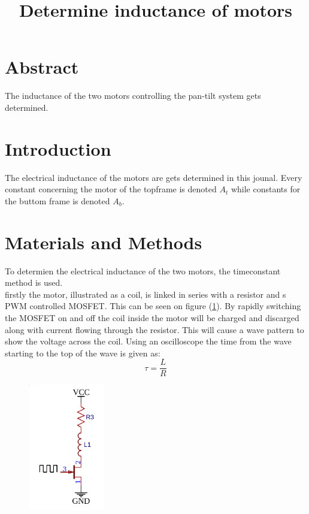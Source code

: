 \documentclass[../../rapport/main]{article}
\title{Determine inductance of motors}
\begin{document}
\section{Abstract}
The inductance of the two motors controlling the pan-tilt system gets determined.
\section{Introduction}
The electrical inductance of the motors are gets determined in this jounal. Every constant concerning the motor of the topframe is denoted $A_t$ while constants for the buttom frame is denoted $A_b$.
\section{Materials and Methods}

To determien the electrical inductance of the two motors, the timeconstant method is used.\\
firstly the motor, illustrated as a coil, is linked in series with a resistor and s PWM controlled MOSFET. This can be seen on figure (\ref{fig:inductance_circuit}). By rapidly switching the MOSFET on and off the coil inside the motor will be charged and discarged along with current flowing through the resistor. This will cause a wave pattern to show the voltage across the coil. Using an oscilloscope the time from the wave starting to the top of the wave is given as:
$$\tau = \frac{L}{R}$$

\begin{figure}
  \label{fig:inductance_circuit}
  \begin{center}
    \includegraphics[width=0.3\textwidth]{screenshot-2019:05:08:14:11:39.png}
  \end{center}
\end{figure}
\end{document}
